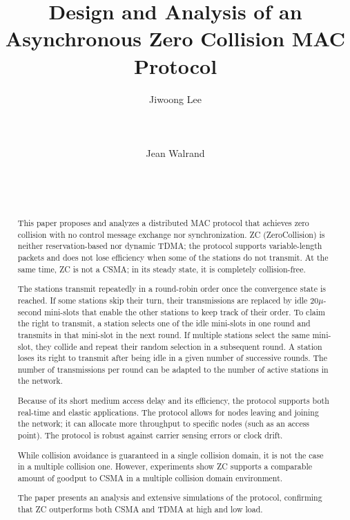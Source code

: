 \documentclass{acm_proc_article-sp}
\begin{document}
\title{Design and Analysis of an Asynchronous Zero Collision MAC Protocol}
\author{
\alignauthor
Jiwoong Lee\\
       \\
       \\
       \\
\alignauthor
Jean Walrand\\
       \\
       \\
       \\
}

\maketitle
\begin{abstract}
This paper proposes and analyzes a distributed MAC protocol that achieves zero collision with no control message exchange nor synchronization. ZC (ZeroCollision) is neither reservation-based nor dynamic TDMA; the protocol supports variable-length packets and does not lose efficiency when some of the stations do not transmit. At the same time, ZC is not a CSMA; in its steady state, it is completely collision-free.

The stations transmit repeatedly in a round-robin order once the convergence state is reached. If some stations skip their turn, their transmissions are replaced by idle $20 \mu$-second mini-slots that enable the other stations to keep track of their order. To claim the right to transmit, a station selects one of the idle mini-slots in one round and transmits in that mini-slot in the next round. If multiple stations select the same mini-slot, they collide and repeat their random selection in a subsequent round.  A station loses its right to transmit after being idle in a given number of successive rounds. The number of transmissions per round can be adapted to the number of active stations in the network.

Because of its short medium access delay  and its efficiency, the protocol supports both real-time and elastic applications. The protocol allows for nodes leaving and joining the network; it can allocate more throughput to specific nodes (such as an access point). The protocol is robust against carrier sensing errors or clock drift.

While collision avoidance is guaranteed in a single collision domain, it is not the case in a multiple collision one. However, experiments show ZC supports a comparable amount of goodput to CSMA in a multiple collision domain environment.

The paper presents an analysis and extensive simulations of the protocol, confirming that ZC outperforms both CSMA and TDMA at high and low load.


\end{abstract}
\end{document}
